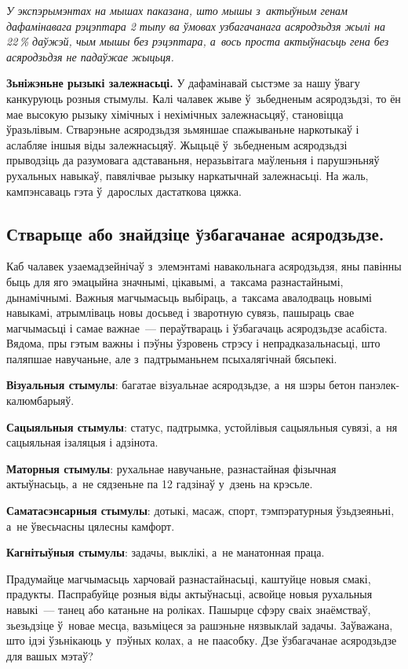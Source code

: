 \emph{У экспэрымэнтах на мышах паказана, што мышы з~актыўным генам дафамінавага рэцэптара 2 тыпу ва ўмовах узбагачанага асяродзьдзя жылі на 22\,\% даўжэй, чым мышы без рэцэптара, а~вось проста актыўнасьць гена без асяродзьдзя не падаўжае жыцьця.} 

\textbf{Зьніжэньне рызыкі залежнасьці.} У дафамінавай сыстэме за нашу ўвагу канкуруюць розныя стымулы. Калі чалавек жыве ў~зьбедненым асяродзьдзі, то ён мае высокую рызыку хімічных і нехімічных залежнасьцяў, становіцца ўразьлівым. Стварэньне асяродзьдзя зьмяншае спажываньне наркотыкаў і аслабляе іншыя віды залежнасьцяў. Жыцьцё ў~зьбедненым асяродзьдзі прыводзіць да разумовага адставаньня, неразьвітага маўленьня і парушэньняў рухальных навыкаў, павялічвае рызыку наркатычнай залежнасьці. На жаль, кампэнсаваць гэта ў~дарослых дастаткова цяжка.

\subsection*{Стварыце або знайдзіце ўзбагачанае асяродзьдзе.}

Каб чалавек узаемадзейнічаў з~элемэнтамі навакольнага асяродзьдзя, яны павінны быць для яго эмацыйна значнымі, цікавымі, а~таксама разнастайнымі, дынамічнымі. Важныя магчымасьць выбіраць, а~таксама авалодваць новымі навыкамі, атрымліваць новы досьвед і зваротную сувязь, пашыраць свае магчымасьці і самае важнае~--- пераўтвараць і ўзбагачаць асяродзьдзе асабіста. Вядома, пры гэтым важны і пэўны ўзровень стрэсу і непрадказальнасьці, што паляпшае навучаньне, але з~падтрыманьнем псыхалягічнай бясьпекі. 

\textbf{Візуальныя стымулы}: багатае візуальнае асяродзьдзе, а~ня шэры бетон панэлек-калюмбарыяў. 

\textbf{Сацыяльныя стымулы}: статус, падтрымка, устойлівыя сацыяльныя сувязі, а~ня сацыяльная ізаляцыя і адзінота. 

\textbf{Маторныя стымулы}: рухальнае навучаньне, разнастайная фізычная актыўнасьць, а~не сядзеньне па 12 гадзінаў у~дзень на крэсьле. 

\textbf{Саматасэнсарныя стымулы}: дотыкі, масаж, спорт, тэмпэратурныя ўзьдзеяньні, а~не ўвесьчасны цялесны камфорт.

\textbf{Кагнітыўныя стымулы}: задачы, выклікі, а~не манатонная праца.

Прадумайце магчымасьць харчовай разнастайнасьці, каштуйце новыя смакі, прадукты. Паспрабуйце розныя віды актыўнасьці, асвойце новыя рухальныя навыкі~--- танец або катаньне на роліках. Пашырце сфэру сваіх знаёмстваў, зьезьдзіце ў~новае месца, вазьміцеся за рашэньне нязвыклай задачы. Заўважана, што ідэі ўзьнікаюць у~пэўных колах, а~не паасобку. Дзе ўзбагачанае асяродзьдзе для вашых мэтаў?

